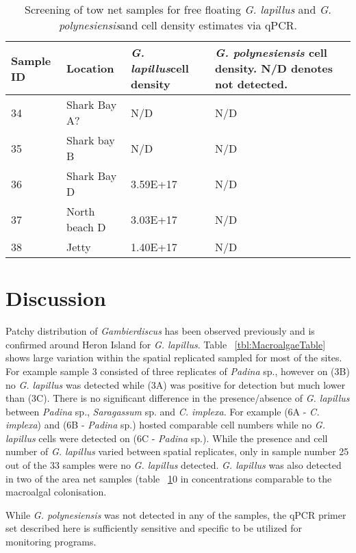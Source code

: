 \documentclass[12pt]{article}
\begin{document}
\FloatBarrier
\FloatBarrier
\begin{table}
\caption{Screening of tow net samples for free floating \emph{G. lapillus} and \emph{G. polynesiensis}and cell density estimates via qPCR.}
\label{tbl:NetTable}
\begin{tabular}{ | p{4cm} | p{4cm} |p{4cm} | p{4cm} | }
\hline
\textbf{Sample ID}&\textbf{Location}&\textbf{\emph{G. lapillus}cell density}&\textbf{\emph{G. polynesiensis} cell density. N/D denotes not detected.}\\
\hline
34&Shark Bay A?&N/D&N/D\\
\hline
35&Shark bay B&N/D&N/D\\
\hline
36&Shark Bay D&3.59E+17
&N/D\\
\hline
37&North beach D&3.03E+17
&N/D\\
\hline
38&Jetty&1.40E+17
&N/D\\
\hline
\end{tabular}
\end{table}
\FloatBarrier
\newpage
\section{Discussion}

Patchy distribution of \emph{Gambierdiscus} has been observed previously and is confirmed around Heron Island for \emph{G. lapillus}. Table ~\ref{tbl:MacroalgaeTable} shows large variation within the spatial replicated sampled for most of the sites. For example sample 3 consisted of three replicates of \emph{Padina} sp., however on (3B) no \emph{G. lapillus} was detected while (3A) was positive for detection but much lower than (3C).
There is no significant difference in the presence/absence of \emph{G. lapillus} between \emph{Padina} sp., \emph{Saragassum} sp. and \emph{C. implexa}. For example (6A - \emph{C. implexa}) and (6B - \emph{Padina} sp.) hosted comparable cell numbers while no \emph{G. lapillus} cells were detected on (6C - \emph{Padina} sp.). While the presence and cell number of \emph{G. lapillus} varied between spatial replicates, only in sample number 25 out of the 33 samples were no \emph{G. lapillus} detected. \emph{G. lapillus} was also detected in two of the area net samples (table ~\ref{tbl:NetTable}0 in concentrations comparable to the macroalgal colonisation.

While \emph{G. polynesiensis} was not detected in any of the samples, the qPCR primer set described here is sufficiently sensitive and specific to be utilized for monitoring programs.
\end{document}
